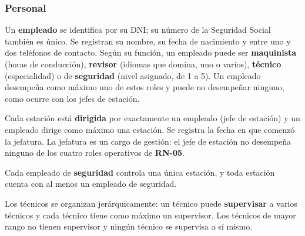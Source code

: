 \documentclass[11pt,a4paper]{article}
\DeclareRobustCommand{\_}{\textunderscore\allowbreak}
\newcommand{\RN}[1]{\textbf{RN-#1}}
\begin{document}
\subsubsection*{Personal}
\begin{description}[leftmargin=1.4cm,style=nextline]
\item[\RN{05}] Un \textbf{empleado} se identifica por su DNI; su número de la Seguridad Social también es único. Se registran su nombre, su fecha de nacimiento y entre uno y dos teléfonos de contacto. Según su función, un empleado puede ser \textbf{maquinista} (horas de conducción), \textbf{revisor} (idiomas que domina, uno o varios), \textbf{técnico} (especialidad) o de \textbf{seguridad} (nivel asignado, de 1 a 5). Un empleado desempeña como máximo uno de estos roles y puede no desempeñar ninguno, como ocurre con los jefes de estación.
\item[\RN{06}] Cada estación está \textbf{dirigida} por exactamente un empleado (jefe de estación) y un empleado dirige como máximo una estación. Se registra la fecha en que comenzó la jefatura. La jefatura es un cargo de gestión: el jefe de estación no desempeña ninguno de los cuatro roles operativos de \RN{05}.
\item[\RN{07}] Cada empleado de \textbf{seguridad} controla una única estación, y toda estación cuenta con al menos un empleado de seguridad.
\item[\RN{08}] Los técnicos se organizan jerárquicamente: un técnico puede \textbf{supervisar} a varios técnicos y cada técnico tiene como máximo un supervisor. Los técnicos de mayor rango no tienen supervisor y ningún técnico se supervisa a sí mismo.
\end{description}
\end{document}
